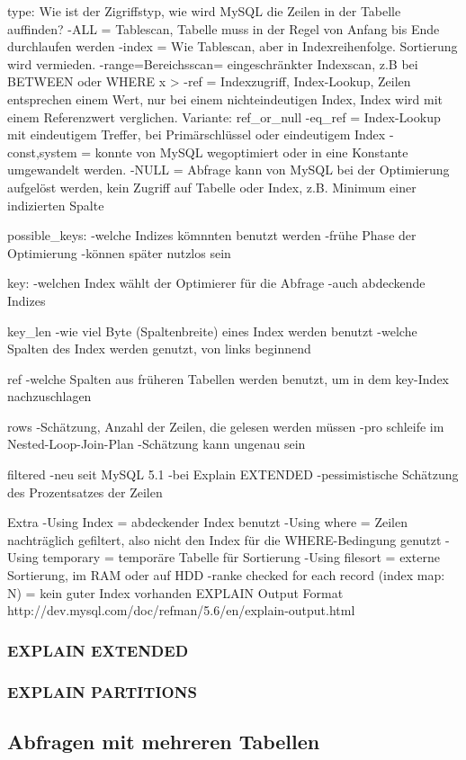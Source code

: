 type: 
Wie ist der Zigriffstyp, wie wird MySQL die Zeilen in der Tabelle auffinden?
-ALL = Tablescan, Tabelle muss in der Regel von Anfang bis Ende durchlaufen werden
-index = Wie Tablescan, aber in Indexreihenfolge. Sortierung wird vermieden.
-range=Bereichsscan= eingeschränkter Indexscan, z.B bei BETWEEN oder WHERE x >
-ref = Indexzugriff, Index-Lookup, Zeilen entsprechen einem Wert, nur bei einem nichteindeutigen Index, Index wird mit einem Referenzwert verglichen. Variante: ref_or_null
-eq_ref = Index-Lookup mit eindeutigem Treffer, bei Primärschlüssel oder eindeutigem Index
-const,system = konnte von MySQL wegoptimiert oder in eine Konstante umgewandelt werden.
-NULL = Abfrage kann von MySQL bei der Optimierung aufgelöst werden, kein Zugriff auf Tabelle oder Index, z.B. Minimum einer indizierten Spalte

possible_keys:
-welche Indizes kömnnten benutzt werden
-frühe Phase der Optimierung
-können später nutzlos sein

key:
-welchen Index wählt der Optimierer für die Abfrage
-auch abdeckende Indizes

key_len
-wie viel Byte (Spaltenbreite) eines Index werden benutzt
-welche Spalten des Index werden genutzt, von links beginnend

ref
-welche Spalten aus früheren Tabellen werden benutzt, um in dem key-Index nachzuschlagen

rows
-Schätzung, Anzahl der Zeilen, die gelesen werden müssen
-pro schleife im Nested-Loop-Join-Plan
-Schätzung kann ungenau sein

filtered
-neu seit MySQL 5.1
-bei Explain EXTENDED
-pessimistische Schätzung des Prozentsatzes der Zeilen

Extra
-Using Index = abdeckender Index benutzt
-Using where = Zeilen nachträglich gefiltert, also nicht den Index für die WHERE-Bedingung genutzt
-Using temporary = temporäre Tabelle für Sortierung
-Using filesort = externe Sortierung, im RAM oder auf HDD
-ranke checked for each record (index map: N) = kein guter Index vorhanden
EXPLAIN Output Format http://dev.mysql.com/doc/refman/5.6/en/explain-output.html

\subsubsection{EXPLAIN EXTENDED}
\subsubsection{EXPLAIN PARTITIONS}
\subsection{Abfragen mit mehreren Tabellen}
